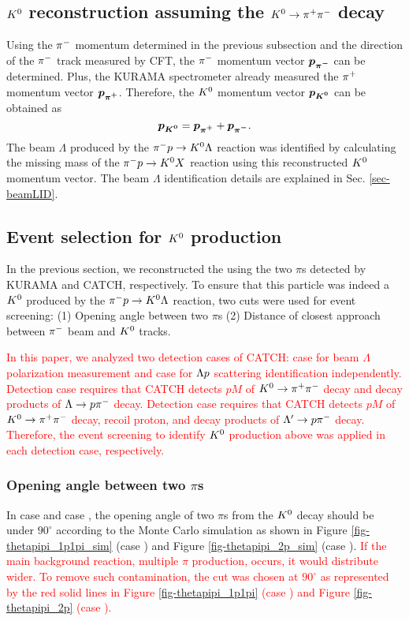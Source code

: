 \clearpage
\subsection{$K^{0}$ reconstruction assuming the $K^0 \to \pi^+ \pi^-$ decay}
Using the $\pi^{-}$ momentum determined in the previous subsection and the direction of the $\pi^{-}$ track measured by CFT, the $\pi^{-}$ momentum vector $\bm{p_{\pi^{-}}}$ can be determined. Plus, the KURAMA spectrometer already measured the $\pi^{+}$ momentum vector $\bm{p_{\pi^{+}}}$. Therefore, the $K^{0}$ momentum vector $\bm{p_{K^{0}}}$ can be obtained as
\begin{equation}
  \bm{p_{K^{0}}} = \bm{p_{\pi^{+}}} + \bm{p_{\pi^{-}}}.
\end{equation}
The beam $\Lambda$ produced by the $\pi^- p \to K^0 \Lambda$ reaction was identified by calculating the missing mass of the $\pi^- p \to K^0 X$ reaction using this reconstructed $K^{0}$ momentum vector. The beam $\Lambda$ identification details are explained in Sec. \ref{sec-beamLID}.

\subsection{Event selection for $K^{0}$ production}
\label{sec-Lbeam-EVselect}
In the previous section, we reconstructed the  using the two $\pi$s detected by KURAMA and CATCH, respectively. To ensure that this particle was indeed a $K^{0}$ produced by the $\pi^- p \to K^0 \Lambda$ reaction, two cuts were used for event screening: (1) Opening angle between two $\pi$s (2) Distance of closest approach between $\pi^{-}$ beam and $K^{0}$ tracks. 

\textcolor{red}{ In this paper, we analyzed two detection cases of CATCH: case  for beam $\Lambda$ polarization measurement and case  for $\Lambda p$ scattering identification independently. Detection case  requires that CATCH detects $pM$ of $K^0 \to \pi^+ \pi^-$ decay and decay products of $\Lambda\to p\pi^{-}$ decay. Detection case  requires that CATCH detects $pM$ of $K^0 \to \pi^+ \pi^-$ decay, recoil proton, and decay products of $\Lambda'\to p\pi^{-}$ decay. Therefore, the event screening to identify $K^{0}$ production above was applied in each detection case, respectively. }




\subsubsection{Opening angle between two $\pi$s}
In case  and case , the opening angle of two $\pi$s from the $K^{0}$ decay should be under $90^{\circ}$ according to the Monte Carlo simulation as shown in Figure \ref{fig-thetapipi_1p1pi_sim} (case ) and Figure \ref{fig-thetapipi_2p_sim} (case ). \textcolor{red}{ If the main background reaction, multiple $\pi$ production, occurs, it would distribute wider. To remove such contamination, the cut was chosen at $90^{\circ}$ as represented by the red solid lines in Figure \ref{fig-thetapipi_1p1pi} (case ) and Figure \ref{fig-thetapipi_2p} (case ). }

